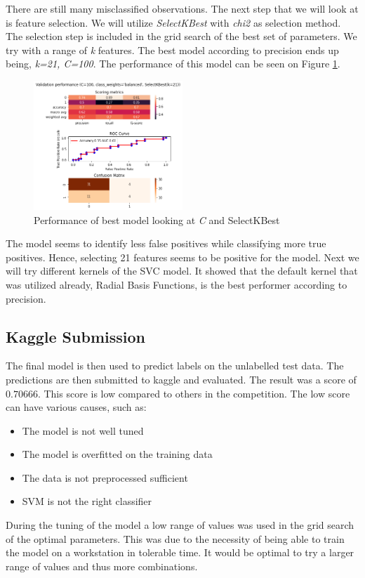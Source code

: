 There are still many misclassified observations. The next step that we will look at is feature selection. We will utilize \textit{SelectKBest} with \textit{chi2} as selection method. The selection step is included in the grid search of the best set of parameters. We try with a range of \textit{k} features. The best model according to precision ends up being, \textit{k=21, C=100}. The performance of this model can be seen on Figure \ref{fig:results_gridcv_balanced_C_selKBest}.

\begin{figure}[htbp!]
  \centering
  \includegraphics[width=0.5\textwidth]{../project/images/results_gridcv_balanced-C-selectKBest.png}
  \caption{Performance of best model looking at \textit{C} and SelectKBest}
  \label{fig:results_gridcv_balanced_C_selKBest}
\end{figure}

The model seems to identify less false positives while classifying more true positives. Hence, selecting 21 features seems to be positive for the model. Next we will try different kernels of the SVC model. It showed that the default kernel that was utilized already, Radial Basis Functions, is the best performer according to precision.  

\subsection{Kaggle Submission}
The final model is then used to predict labels on the unlabelled test data. The predictions are then submitted to kaggle and evaluated. The result was a score of $0.70666$. This score is low compared to others in the competition. The low score can have various causes, such as:
\begin{itemize}
  \item The model is not well tuned
  \item The model is overfitted on the training data
  \item The data is not preprocessed sufficient
  \item SVM is not the right classifier
\end{itemize}
During the tuning of the model a low range of values was used in the grid search of the optimal parameters. This was due to the necessity of being able to train the model on a workstation in tolerable time. It would be optimal to try a larger range of values and thus more combinations. 

